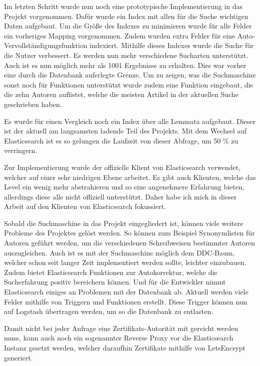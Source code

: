 Im letzten Schritt wurde nun noch eine prototypische Implementierung in das Projekt vorgenommen. Dafür wurde ein Index mit allen für die Suche wichtigen Daten aufgebaut. Um die Größe des Indexes zu minimieren wurde für alle Felder ein vorheriges Mapping vorgenommen. Zudem wurden extra Felder für eine Auto-Vervollständigungsfunktion indexiert. Mithilfe dieses Indexes wurde die Suche für die Nutzer verbessert. Es werden nun mehr verschiedene Sucharten unterstützt. Auch ist es nun möglich mehr als 1001 Ergebnisse zu erhalten. Dies war vorher eine durch die Datenbank auferlegte Grenze. Um zu zeigen, was die Suchmaschine sonst noch für Funktionen unterstützt wurde zudem eine Funktion eingebaut, die die zehn Autoren auflistet, welche die meisten Artikel in der aktuellen Suche geschrieben haben. 

Es wurde für einen Vergleich noch ein Index über alle Lemmata aufgebaut. Dieser ist der aktuell am langsamsten ladende Teil des Projekts. Mit dem Wechsel auf Elasticsearch ist es so gelungen die Laufzeit von dieser Abfrage, um 50 \% zu verringern. 

Zur Implementierung wurde der offizielle Klient von Elasticsearch verwendet, welcher auf einer sehr niedrigen Ebene arbeitet. Es gibt auch Klienten, welche das Level ein wenig mehr abstrahieren und so eine angenehmere Erfahrung bieten, allerdings diese alle nicht offiziell unterstützt. Daher habe ich mich in dieser Arbeit auf den Klienten von Elasticsearch fokussiert. 

Sobald die Suchmaschine in das Projekt eingegliedert ist, können viele weitere Probleme des Projektes gelöst werden. So können zum Beispiel Synonymlisten für Autoren geführt werden, um die verschiedenen Schreibweisen bestimmter Autoren auszugleichen. Auch ist es mit der Suchmaschine möglich dem DDC-Baum, welcher schon seit langer Zeit implementiert werden sollte, leichter einzubauen. Zudem bietet Elasticsearch Funktionen zur Autokorrektur, welche die Sucherfahrung positiv bereichern können. Und für die Entwickler nimmt Elasticsearch einiges an Problemen mit der Datenbank ab. Aktuell werden viele Felder mithilfe von Triggern und Funktionen erstellt. Diese Trigger können nun auf Logstash übertragen werden, um so die Datenbank zu entlasten.

Damit nicht bei jeder Anfrage eine Zertifikats-Autorität mit gereicht werden muss, kann auch noch ein sogenannter Reverse Proxy vor die Elasticsearch Instanz gesetzt werden, welcher daraufhin Zertifikate mithilfe von LetsEncrypt generiert.